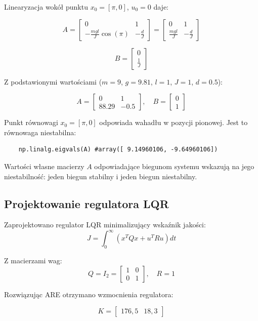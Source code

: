 \documentclass[11pt]{article}
\begin{document}
Linearyzacja wokół punktu $x_0 = [\pi, 0]$, $u_0 = 0$ daje:

\[
A = \begin{bmatrix}
    0 & 1\\
    -\frac{mgl}{J}\cos(\pi) & -\frac{d}{J}
\end{bmatrix} = \begin{bmatrix}
    0 & 1\\
    \frac{mgl}{J} & -\frac{d}{J}
\end{bmatrix}
\]

\[
B = \begin{bmatrix}
    0\\
    \frac{1}{J}
\end{bmatrix}
\]

Z podstawionymi wartościami ($m=9$, $g=9.81$, $l=1$, $J=1$, $d=0.5$):

\[
A = \begin{bmatrix}
    0 & 1\\
    88.29 & -0.5
\end{bmatrix}, \quad
B = \begin{bmatrix}
    0\\
    1
\end{bmatrix}
\]

Punkt równowagi $x_0 = [\pi, 0]$ odpowiada wahadłu w pozycji pionowej. Jest to równowaga niestabilna:

\begin{lstlisting}
    np.linalg.eigvals(A) #array([ 9.14960106, -9.64960106])
\end{lstlisting}

Wartości własne macierzy $A$ odpowiadające biegunom systemu wskazują na jego niestabilność: jeden biegun stabilny i jeden biegun niestabilny.

\subsection{Projektowanie regulatora LQR}

Zaprojektowano regulator LQR minimalizujący wskaźnik jakości:
\[
J = \int_0^\infty (x^T Q x + u^T R u) dt
\]

Z macierzami wag:
\[
Q = I_2 = \begin{bmatrix} 1 & 0 \\ 0 & 1 \end{bmatrix}, \quad R = 1
\]

Rozwiązując ARE otrzymano wzmocnienia regulatora:

\[
K=\begin{bmatrix}
    176,5 & 18,3
\end{bmatrix}
\]
\end{document}
